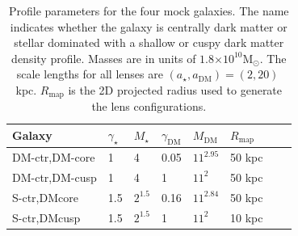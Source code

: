 \documentclass[galley,usenatbib]{mn2e}
\newcommand{\Rmap}{\ensuremath{R_\mathrm{map}}}
\newcommand{\Msun}{\ensuremath{\mathrm{M}_\odot}}
\newcommand{\e}[1]{\ensuremath{\times 10^{#1}}}
\begin{document}
\begin{table}
\begin{tabular}{llllllll}
Galaxy & $\gamma_\star$ & $M_\star$ & $\gamma_\mathrm{DM}$ & $M_\mathrm{DM}$ & $\Rmap$ \\
\hline
DM-ctr,DM-core & 1 & 4 & 0.05 & $11^{2.95}$ & 50 kpc\\ %
DM-ctr,DM-cusp & 1 & 4 & 1 & $11^2$ & 50 kpc \\ %
S-ctr,DMcore & 1.5 & $2^{1.5}$ & 0.16 & $11^{2.84}$ & 50 kpc \\ %
S-ctr,DMcusp & 1.5 & $2^{1.5}$ & 1 & $11^2$ & 10 kpc %
\end{tabular}
\caption{Profile parameters for the four mock galaxies. The name indicates whether 
  the galaxy is centrally dark matter or stellar dominated with a shallow or cuspy 
  dark matter density profile.  Masses are in units of
  $1.8\e{10}\Msun$. The scale lengths for all lenses are
  $(a_\star,a_\mathrm{DM})=(2,20)$\,kpc. $\Rmap$ is the 2D projected radius
used to generate the lens configurations.}
\label{mock galaxy params}
\end{table}
\end{document}
